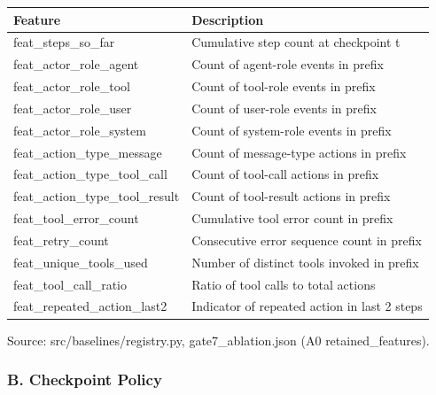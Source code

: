\documentclass[
]{article}
\newcounter{none} %
\begin{document}
{\def\LTcaptype{none} %
\begin{longtable}[]{@{}
  >{\raggedright\arraybackslash}p{}
  >{\raggedright\arraybackslash}p{}@{}}
\toprule\noalign{}
\begin{minipage}[b]{\linewidth}\raggedright
Feature
\end{minipage} & \begin{minipage}[b]{\linewidth}\raggedright
Description
\end{minipage} \\
\midrule\noalign{}
\endhead
\bottomrule\noalign{}
\endlastfoot
feat\_steps\_so\_far & Cumulative step count at checkpoint t \\
feat\_actor\_role\_agent & Count of agent-role events in prefix \\
feat\_actor\_role\_tool & Count of tool-role events in prefix \\
feat\_actor\_role\_user & Count of user-role events in prefix \\
feat\_actor\_role\_system & Count of system-role events in prefix \\
feat\_action\_type\_message & Count of message-type actions in prefix \\
feat\_action\_type\_tool\_call & Count of tool-call actions in prefix \\
feat\_action\_type\_tool\_result & Count of tool-result actions in
prefix \\
feat\_tool\_error\_count & Cumulative tool error count in prefix \\
feat\_retry\_count & Consecutive error sequence count in prefix \\
feat\_unique\_tools\_used & Number of distinct tools invoked in
prefix \\
feat\_tool\_call\_ratio & Ratio of tool calls to total actions \\
feat\_repeated\_action\_last2 & Indicator of repeated action in last 2
steps \\
\end{longtable}
}

Source: src/baselines/registry.py, gate7\_ablation.json (A0
retained\_features).

\subsubsection{B. Checkpoint Policy}\label{b.-checkpoint-policy}
\end{document}

